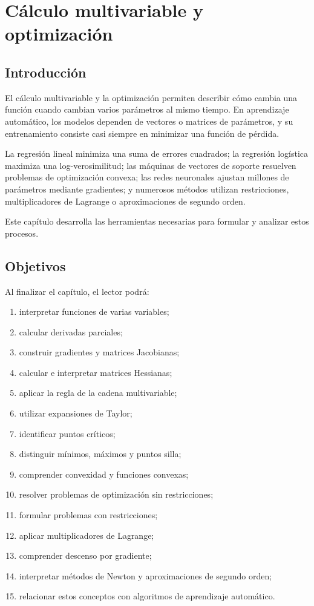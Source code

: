 \documentclass[
  spanish,
  11pt,
  letterpaper,
  DIV=11,
  numbers=noendperiod]{scrreprt}
\providecommand{\tightlist}{%
  \setlength{\itemsep}{0pt}\setlength{\parskip}{0pt}}
\theoremstyle{definition}
\theoremstyle{plain}
\theoremstyle{definition}
\theoremstyle{remark}
\begin{document}
\chapter{Cálculo multivariable y
optimización}\label{sec-calculo-optimizacion}

\section{Introducción}\label{introducciuxf3n-4}

El cálculo multivariable y la optimización permiten describir cómo
cambia una función cuando cambian varios parámetros al mismo tiempo. En
aprendizaje automático, los modelos dependen de vectores o matrices de
parámetros, y su entrenamiento consiste casi siempre en minimizar una
función de pérdida.

La regresión lineal minimiza una suma de errores cuadrados; la regresión
logística maximiza una log-verosimilitud; las máquinas de vectores de
soporte resuelven problemas de optimización convexa; las redes
neuronales ajustan millones de parámetros mediante gradientes; y
numerosos métodos utilizan restricciones, multiplicadores de Lagrange o
aproximaciones de segundo orden.

Este capítulo desarrolla las herramientas necesarias para formular y
analizar estos procesos.

\section{Objetivos}\label{objetivos-3}

Al finalizar el capítulo, el lector podrá:

\begin{enumerate}
\def\labelenumi{\arabic{enumi}.}
\tightlist
\item
  interpretar funciones de varias variables;
\item
  calcular derivadas parciales;
\item
  construir gradientes y matrices Jacobianas;
\item
  calcular e interpretar matrices Hessianas;
\item
  aplicar la regla de la cadena multivariable;
\item
  utilizar expansiones de Taylor;
\item
  identificar puntos críticos;
\item
  distinguir mínimos, máximos y puntos silla;
\item
  comprender convexidad y funciones convexas;
\item
  resolver problemas de optimización sin restricciones;
\item
  formular problemas con restricciones;
\item
  aplicar multiplicadores de Lagrange;
\item
  comprender descenso por gradiente;
\item
  interpretar métodos de Newton y aproximaciones de segundo orden;
\item
  relacionar estos conceptos con algoritmos de aprendizaje automático.
\end{enumerate}
\end{document}
